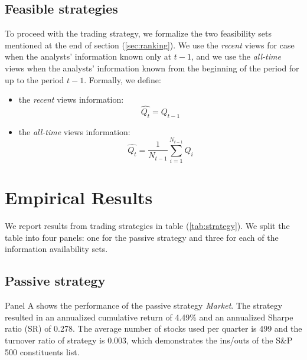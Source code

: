\documentclass{article}\usepackage[]{graphicx}\usepackage[]{color}
\newcommand{\naive}{\textit{recent}}
\newcommand{\default}{\textit{all-time}}
\begin{document}
\subsection{Feasible strategies}
To proceed with the trading strategy, we formalize the two feasibility sets mentioned at the end of section (\ref{sec:ranking}). We use the \naive{} views for case when the analysts' information known only at $t-1$, and we use the \default{} views when the analysts' information known from the beginning of the period for up to the period $t-1$. Formally, we define:
\begin{itemize}

\item  the \naive{} views information:
\begin{equation}
\label{naive:ranking}
\widehat{Q_{t}}=Q_{t-1}
\end{equation}

\item  the \default{} views information:
\begin{equation}
\label{default.rank}
\widehat{Q_{t}} = \frac{1}{N_{t-1}} \sum_{i=1}^{N_{t-1}} Q_{i}
\end{equation}
\end{itemize}

\section{Empirical Results}
\label{sec:results}

We report results from trading strategies in table (\ref{tab:strategy}). We split the table into four panels: one for the passive strategy and three for each of the information availability sets. 

\subsection{Passive strategy}
Panel A shows  the performance of the passive strategy \textit{Market}. The strategy resulted in an annualized cumulative return of 4.49\% and an annualized Sharpe ratio (SR) of 0.278. The average number of stocks used per quarter is 499 and the turnover ratio of strategy is 0.003, which demonstrates the ins/outs of the S\&P 500 constituents list.
\end{document}
